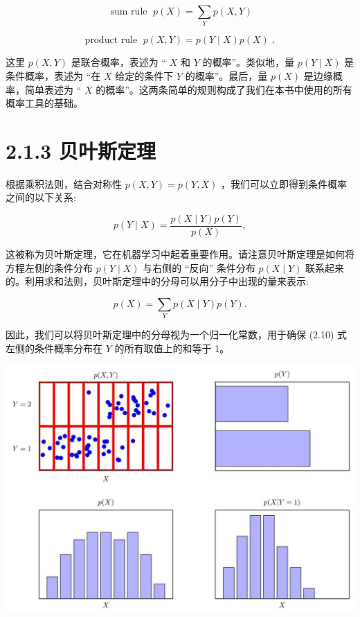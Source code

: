 \documentclass[10pt]{report}
\begin{document}
\[
\text{ sum rule }\;p\left( X\right)  = \mathop{\sum }\limits_{Y}p\left( {X,Y}\right)  \tag{2.8}
\]

\[
\text{ product rule }\;p\left( {X,Y}\right)  = p\left( {Y \mid  X}\right) p\left( X\right) \text{ . } \tag{2.9}
\]

这里 \(p\left( {X,Y}\right)\) 是联合概率，表述为 “ \(X\) 和 \(Y\) 的概率”。类似地，量 \(p\left( {Y \mid  X}\right)\) 是条件概率，表述为 “在 \(X\) 给定的条件下 \(Y\) 的概率”。最后，量 \(p\left( X\right)\) 是边缘概率，简单表述为 “ \(X\) 的概率”。这两条简单的规则构成了我们在本书中使用的所有概率工具的基础。

\section*{2.1.3 贝叶斯定理}

根据乘积法则，结合对称性 \(p\left( {X,Y}\right)  = p\left( {Y,X}\right)\) ，我们可以立即得到条件概率之间的以下关系:

\[
p\left( {Y \mid  X}\right)  = \frac{p\left( {X \mid  Y}\right) p\left( Y\right) }{p\left( X\right) }, \tag{2.10}
\]

这被称为贝叶斯定理，它在机器学习中起着重要作用。请注意贝叶斯定理是如何将方程左侧的条件分布 \(p\left( {Y \mid  X}\right)\) 与右侧的 “反向” 条件分布 \(p\left( {X \mid  Y}\right)\) 联系起来的。利用求和法则，贝叶斯定理中的分母可以用分子中出现的量来表示:

\[
p\left( X\right)  = \mathop{\sum }\limits_{Y}p\left( {X \mid  Y}\right) p\left( Y\right) . \tag{2.11}
\]

因此，我们可以将贝叶斯定理中的分母视为一个归一化常数，用于确保 (2.10) 式左侧的条件概率分布在 \(Y\) 的所有取值上的和等于 1。

\begin{center}
\includegraphics[max width=1.0\textwidth]{images/0194e279-9b28-703a-88f4-c3ac21e2010d_48_213_376_1321_932_0.jpg}
\end{center}
\hspace*{3em} 
\end{document}
